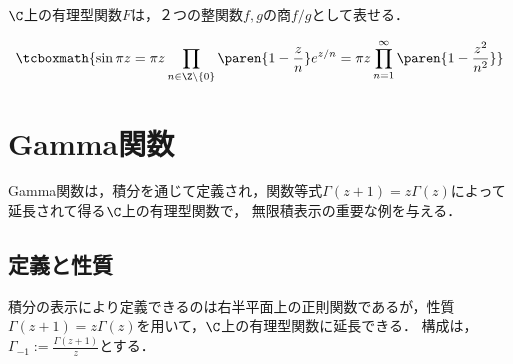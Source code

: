 \documentclass[uplatex, dvipdfmx]{jsreport}
\begin{document}
\begin{corollary}
    $\C$上の有理型関数$F$は，２つの整関数$f,g$の商$f/g$として表せる．
\end{corollary}

\begin{example}
    \[\tcboxmath{\sin\pi z=\pi z\prod_{n\in\Z\setminus\{0\}}\paren{1-\frac{z}{n}}e^{z/n}=\pi z\prod^\infty_{n=1}\paren{1-\frac{z^2}{n^2}}}\]
\end{example}

\section{Gamma関数}

\begin{tcolorbox}[colframe=ForestGreen, colback=ForestGreen!10!white,breakable,colbacktitle=ForestGreen!40!white,coltitle=black,fonttitle=\bfseries\sffamily,
title=]
    Gamma関数は，積分を通じて定義され，関数等式$\Gamma(z+1)=z\Gamma(z)$によって延長されて得る$\C$上の有理型関数で，
    無限積表示の重要な例を与える．
\end{tcolorbox}

\subsection{定義と性質}

\begin{tcolorbox}[colframe=ForestGreen, colback=ForestGreen!10!white,breakable,colbacktitle=ForestGreen!40!white,coltitle=black,fonttitle=\bfseries\sffamily,
title=]
    積分の表示により定義できるのは右半平面上の正則関数であるが，性質$\Gamma(z+1)=z\Gamma(z)$を用いて，$\C$上の有理型関数に延長できる．
    構成は，$\Gamma_{-1}:=\frac{\Gamma(z+1)}{z}$とする．
\end{tcolorbox}
\end{document}
